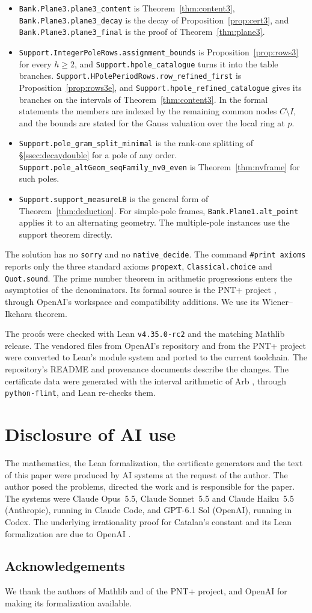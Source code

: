 \documentclass[11pt]{amsart}
\theoremstyle{definition}
\theoremstyle{remark}
\numberwithin{equation}{section}
\newcommand{\lean}[1]{\nolinkurl{#1}}
\begin{document}
\begin{itemize}
 $\gamma_1=0$, and $\gamma_2=0$.
\item \lean{Bank.Plane3.plane3_content} is Theorem~\ref{thm:content3}, \lean{Bank.Plane3.plane3_decay} is the decay of
 Proposition~\ref{prop:cert3}, and \lean{Bank.Plane3.plane3_final} is the proof of Theorem~\ref{thm:plane3}.
\item \lean{Support.IntegerPoleRows.assignment_bounds} is Proposition~\ref{prop:rows3} for every $h\ge2$, and
 \lean{Support.hpole_catalogue} turns it into the table branches. \lean{Support.HPolePeriodRows.row_refined_first} is
 Proposition~\ref{prop:rows3e}, and \lean{Support.hpole_refined_catalogue} gives its branches on the intervals of
 Theorem~\ref{thm:content3}. In the formal statements the members are indexed by the remaining common nodes
 $C\setminus I$, and the bounds are stated for the Gauss valuation over the local ring at $p$.
\item \lean{Support.pole_gram_split_minimal} is the rank-one splitting of \S\ref{ssec:decaydouble} for a pole of any
 order. \lean{Support.pole_altGeom_seqFamily_nv0_even} is Theorem~\ref{thm:nvframe} for such poles.
\item \lean{Support.support_measureLB} is the general form of Theorem~\ref{thm:deduction}. For simple-pole frames,
 \lean{Bank.Plane1.alt_point} applies it to an alternating geometry. The multiple-pole instances use the support theorem directly.
\end{itemize}
The solution has no \lean{sorry} and no \lean{native_decide}. The command \texttt{\#print axioms} reports only the three
standard axioms \lean{propext}, \lean{Classical.choice} and \lean{Quot.sound}. The prime number theorem in arithmetic
progressions enters the asymptotics of the denominators. Its formal source is the PNT+ project \cite{PNTPlus}, through OpenAI's
workspace and compatibility additions. We use its Wiener--Ikehara theorem.

The proofs were checked with Lean \texttt{v4.35.0-rc2} and the matching Mathlib release. The vendored files from OpenAI's
repository and from the PNT+ project were converted to Lean's module system and ported to the current toolchain. The repository's README and provenance documents describe the changes. The certificate data were generated with
the interval arithmetic of Arb \cite{Arb}, through \texttt{python-flint}, and Lean re-checks them.

\section*{Disclosure of AI use}
The mathematics, the Lean formalization, the certificate generators and the text of this paper were produced by AI
systems at the request of the author. The author posed the problems, directed the work and is responsible for the
paper. The systems were Claude Opus~5.5, Claude Sonnet~5.5 and Claude Haiku~5.5 (Anthropic), running in Claude Code,
and GPT-6.1 Sol (OpenAI), running in Codex. The underlying irrationality proof for Catalan's constant and its Lean
formalization are due to OpenAI \cite{OpenAI2026}.

\subsection*{Acknowledgements}
We thank the authors of Mathlib and of the PNT+ project, and OpenAI for making its formalization available.



\end{document}
